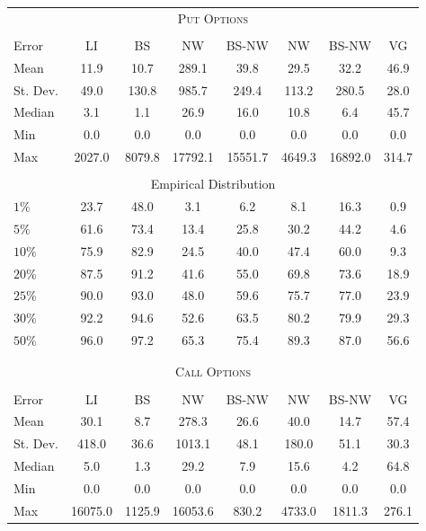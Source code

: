 \begin{center} 
 \begin{tabular*}{\textwidth}{@{\extracolsep{\fill}}lccccccc} 
 \toprule 
 \multicolumn{8}{c}{\textsc{Put Options}}\\ 
 \multicolumn{8}{c}{}\\ 
Error & LI & BS& NW & BS-NW & NW\raisebox{-.4ex}{\tiny CV} & BS-NW\raisebox{-.4ex}{\tiny CV} & VG \\  
 \midrule 
Mean    & 11.9& 10.7& 289.1& 39.8& 29.5& 32.2& 46.9\\ 
St. Dev.& 49.0& 130.8& 985.7& 249.4& 113.2& 280.5& 28.0\\ 
Median  & 3.1& 1.1& 26.9& 16.0& 10.8& 6.4& 45.7\\ 
Min     & 0.0& 0.0& 0.0& 0.0& 0.0& 0.0& 0.0\\ 
Max     & 2027.0& 8079.8& 17792.1& 15551.7& 4649.3& 16892.0& 314.7\\ 
 \multicolumn{8}{c}{}\\ 
 \multicolumn{8}{c}{Empirical Distribution}\\ 
 \midrule 
$1\%$   & 23.7& 48.0& 3.1& 6.2& 8.1& 16.3& 0.9\\ 
$5\%$   & 61.6& 73.4& 13.4& 25.8& 30.2& 44.2& 4.6\\ 
$10\%$  & 75.9& 82.9& 24.5& 40.0& 47.4& 60.0& 9.3\\ 
$20\%$  & 87.5& 91.2& 41.6& 55.0& 69.8& 73.6& 18.9\\ 
$25\%$  & 90.0& 93.0& 48.0& 59.6& 75.7& 77.0& 23.9\\ 
$30\%$  & 92.2& 94.6& 52.6& 63.5& 80.2& 79.9& 29.3\\ 
$50\%$  & 96.0& 97.2& 65.3& 75.4& 89.3& 87.0& 56.6\\ 
 \multicolumn{8}{c}{}\\ 
 \multicolumn{8}{c}{}\\ 
 \toprule 
 \multicolumn{8}{c}{\textsc{Call Options}}\\ 
 \multicolumn{8}{c}{}\\ 
Error & LI & BS& NW & BS-NW & NW\raisebox{-.4ex}{\tiny CV} & BS-NW\raisebox{-.4ex}{\tiny CV} & VG \\  
 \midrule 
Mean    & 30.1& 8.7& 278.3& 26.6& 40.0& 14.7& 57.4\\ 
St. Dev.& 418.0& 36.6& 1013.1& 48.1& 180.0& 51.1& 30.3\\ 
Median  & 5.0& 1.3& 29.2& 7.9& 15.6& 4.2& 64.8\\ 
Min     & 0.0& 0.0& 0.0& 0.0& 0.0& 0.0& 0.0\\ 
Max     & 16075.0& 1125.9& 16053.6& 830.2& 4733.0& 1811.3& 276.1\\ 

\end{tabular*}
\end{center}
